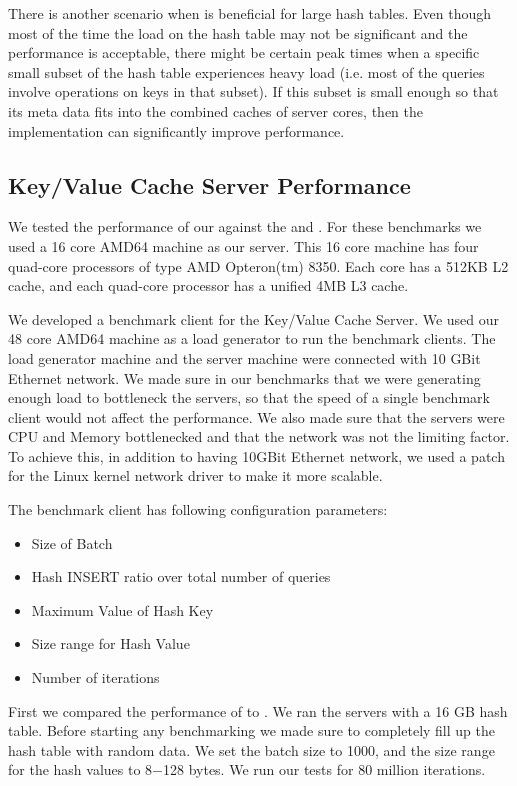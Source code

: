 There is another scenario when \cphash{} is beneficial for large hash tables. Even though most of the time the load on the hash table may not be significant
and the performance is acceptable, there might be certain peak times when a specific small subset of the hash table experiences heavy load (i.e. most of the queries involve 
operations on keys in that subset). If this subset is small enough so that its meta data fits into the combined caches of server cores, then the \cphash{} 
implementation can significantly improve performance.

\subsection{Key/Value Cache Server Performance}
\label{sec:mcserverbench} 

We tested the performance of our \cpserver{} against the \lockserver{} and \memcached{}. For these benchmarks we used a 16 core AMD64 machine as 
our server. This 16 core machine has four quad-core processors of type AMD Opteron(tm) 8350. Each core has a 512KB L2 cache, and each quad-core processor has a 
unified 4MB L3 cache. 

We developed a benchmark client for the Key/Value Cache Server. We used our 48 core AMD64 machine as a load generator to run the benchmark clients. 
The load generator machine and the server machine were connected with 10 GBit Ethernet network. We made sure in our benchmarks that we were generating enough load to 
bottleneck the servers, so that the speed of a single benchmark client would not affect the performance. We also made sure that the servers were CPU and Memory 
bottlenecked and that the network was not the limiting factor. To achieve this, in addition to having 10GBit Ethernet network, we used a 
patch for the Linux kernel network driver \cite{mosbench} to make it more scalable.

The benchmark client has following configuration parameters:
\begin{itemize}
\item Size of Batch
\item Hash INSERT ratio over total number of queries
\item Maximum Value of Hash Key
\item Size range for Hash Value
\item Number of iterations
\end{itemize}

First we compared the performance of \cpserver{} to \lockserver{}. We ran the servers with a 16 GB hash table. Before starting any benchmarking we 
made sure to completely fill up the hash table with random data. We set the batch size to 1000, and the size range for the hash values to 8$-$128 bytes. We run our tests 
for 80 million iterations.


